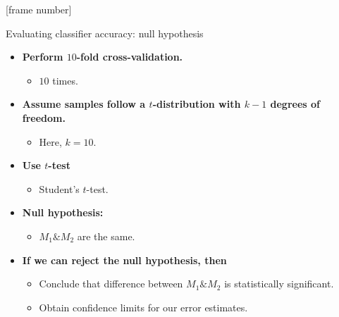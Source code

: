 \documentclass[aspectratio=169,t,table]{beamer}
\begin{document}
  {
    [frame number]
    \begin{frame}{Evaluating classifier accuracy: null hypothesis}
      \begin{itemize}
        \item \textbf{Perform $10$-fold cross-validation.}
        \begin{itemize}
          \item $10$ times.
        \end{itemize}
        \item \textbf{Assume samples follow a $t$-distribution with $k-1$ degrees of freedom.}
        \begin{itemize}
          \item Here, $k = 10$.
        \end{itemize}
        \item \textbf{Use $t$-test}
        \begin{itemize}
          \item Student's $t$-test.
        \end{itemize}
        \item \textbf{Null hypothesis:}
        \begin{itemize}
          \item $M_1 \& M_2$ are the same.
        \end{itemize}
        \item \textbf{If we can reject the null hypothesis, then}
        \begin{itemize}
          \item Conclude that difference between $M_1 \& M_2$ is statistically significant.
          \item Obtain confidence limits for our error estimates.
        \end{itemize}
      \end{itemize}
    \end{frame}
  }
\end{document}
